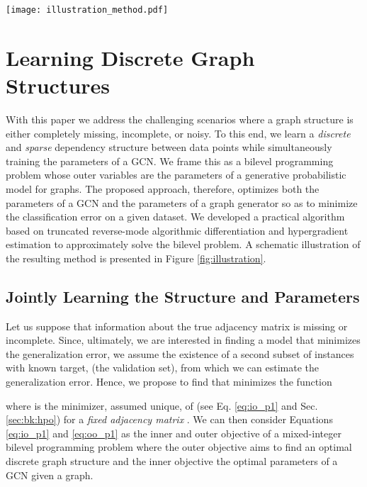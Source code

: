 \documentclass{article}
\begin{document}
\begin{figure*}[t!]
    \centering
    \texttt{[image: illustration\_method.pdf]}
    \vspace{-5mm}
    \caption{\label{fig:illustration}
    Schematic representation of our approach for learning discrete graph structures for GNNs.}
    \vspace{-5mm}
\end{figure*}

	\section{Learning Discrete Graph Structures} \label{sec:method}
	
    With this paper we address the challenging scenarios where a graph structure is either completely missing, incomplete, or noisy. 
   To this end, we learn a \emph{discrete} and \emph{sparse} dependency structure between data points while simultaneously training the parameters of a GCN. We frame this as a bilevel programming problem whose outer variables are the parameters of a generative probabilistic model for graphs. The proposed approach, therefore, optimizes both the parameters of a GCN and the parameters of a graph generator so as to minimize the classification error on a given dataset.     
We developed a practical algorithm based on truncated reverse-mode algorithmic differentiation \citep{williams1990efficient} and hypergradient estimation to approximately solve the bilevel problem. A schematic illustration of the resulting method is presented in Figure \ref{fig:illustration}. 

	


	
\subsection{Jointly Learning the Structure and Parameters}  \label{sec:lsst}

	Let us suppose that information about the true adjacency matrix  is missing or incomplete. 
	Since, ultimately, we are interested in finding a model that minimizes the generalization error, we assume the existence of a second subset of instances with known target,  (the validation set), from which we can estimate the generalization error. Hence, we propose to find
	 that minimizes the function

where  is the minimizer, assumed unique,
of  (see Eq. \eqref{eq:io_p1} and Sec. \ref{sec:bk:hpo}) for a \emph{fixed adjacency matrix} .  
We can then consider Equations \eqref{eq:io_p1} and \eqref{eq:oo_p1} as the inner and outer objective of a mixed-integer bilevel programming problem where the outer objective aims to find an optimal discrete graph structure and the inner objective the optimal parameters of a GCN given a graph. 
\end{document}
